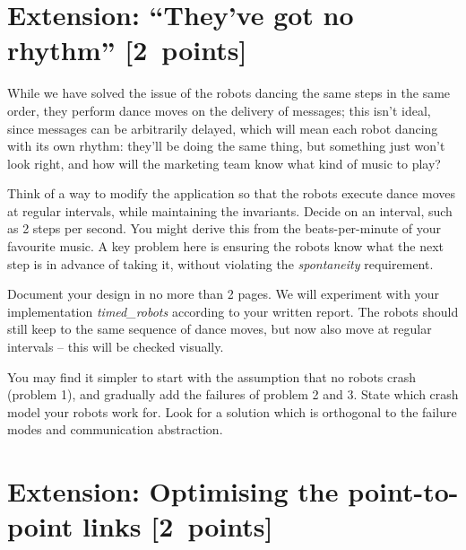 \documentclass[a4paper]{article}
\begin{document}











\section*{Extension: ``They've got no rhythm'' [2~points]} %
\label{sec:buffered_dance_routine}

While we have solved the issue of the robots dancing the same steps in the
same order, they perform dance moves on the delivery of messages; this isn't
ideal, since messages can be arbitrarily delayed, which will mean each robot
dancing with its own rhythm: they'll be doing the same thing, but something
just won't look right, and how will the marketing team know what kind of music
to play?

Think of a way to modify the application so that the robots execute dance
moves at regular intervals, while maintaining the invariants. Decide on an
interval, such as 2 steps per second. You might derive this from the
beats-per-minute of your favourite music. A key problem here is ensuring the
robots know what the next step is in advance of taking it, without violating
the \emph{spontaneity} requirement.

Document your design in no more than 2 pages. We will experiment with your
implementation \emph{timed\_robots} according to your written report.
The robots should still keep to the same sequence of dance moves, but now also
move at regular intervals -- this will be checked visually.

You may find it simpler to start with the assumption that no robots crash
(problem 1), and gradually add the failures of problem 2 and 3. State which
crash model your robots work for. Look for a solution which is orthogonal to
the failure modes and communication abstraction.







\section*{Extension: Optimising the point-to-point links [2~points]} %
\label{sec:extension_optimising_the_link_channels}
\end{document}
